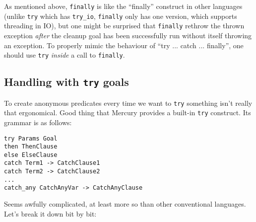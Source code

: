 As mentioned above, \texttt{finally} is like the ``finally'' construct in other languages (unlike \texttt{try} which has \texttt{try_io}, \texttt{finally} only has one version, which supports threading in IO), but one might be surprised that \texttt{finally} rethrow the thrown exception \textit{after} the cleanup goal has been successfully run without itself throwing an exception. To properly mimic the behaviour of ``try ... catch ... finally'', one should use \texttt{try} \textit{inside} a call to \texttt{finally}.

\subsection{Handling with \texttt{try} goals}

To create anonymous predicates every time we want to \texttt{try} something isn't really that ergonomical. Good thing that Mercury provides a built-in \texttt{try} construct. Its grammar is as follows:

\begin{lstlisting}[language=Mercury]
try Params Goal
then ThenClause
else ElseClause
catch Term1 -> CatchClause1
catch Term2 -> CatchClause2
...
catch_any CatchAnyVar -> CatchAnyClause
\end{lstlisting}

Seems awfully complicated, at least more so than other conventional languages. Let's break it down bit by bit:

